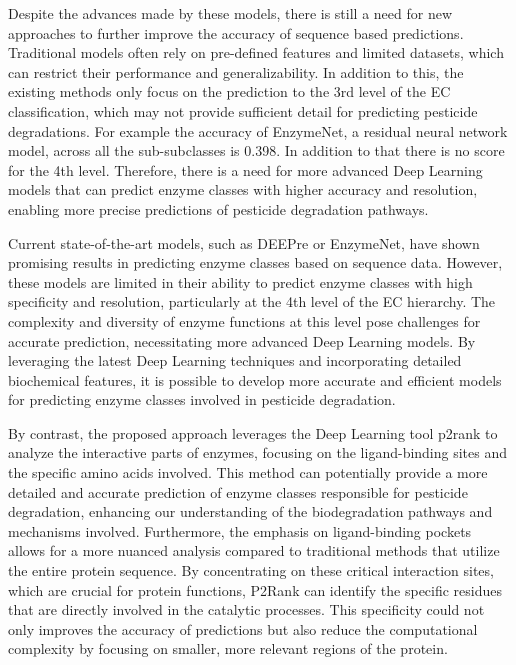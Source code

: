 Despite the advances made by these models, there is still a need for new approaches to further improve the accuracy of sequence based predictions. Traditional models often rely on pre-defined features and limited datasets, which can restrict their performance and generalizability. In addition to this, the existing methods only focus on the prediction to the 3rd level of the EC classification, which may not provide sufficient detail for predicting pesticide degradations. For example the accuracy of EnzymeNet, a residual neural network model, across all the sub-subclasses is 0.398. In addition to that there is no score for the 4th level. Therefore, there is a need for more advanced Deep Learning models that can predict enzyme classes with higher accuracy and resolution, enabling more precise predictions of pesticide degradation pathways. \autocite{watanabeEnzymeNetResidualNeural2023}

Current state-of-the-art models, such as DEEPre or EnzymeNet, have shown promising results in predicting enzyme classes based on sequence data. However, these models are limited in their ability to predict enzyme classes with high specificity and resolution, particularly at the 4th level of the EC hierarchy. The complexity and diversity of enzyme functions at this level pose challenges for accurate prediction, necessitating more advanced Deep Learning models. By leveraging the latest Deep Learning techniques and incorporating detailed biochemical features, it is possible to develop more accurate and efficient models for predicting enzyme classes involved in pesticide degradation.

By contrast, the proposed approach leverages the Deep Learning tool p2rank to analyze the interactive parts of enzymes, focusing on the ligand-binding sites and the specific amino acids involved. This method can potentially provide a more detailed and accurate prediction of enzyme classes responsible for pesticide degradation, enhancing our understanding of the biodegradation pathways and mechanisms involved. Furthermore, the emphasis on ligand-binding pockets allows for a more nuanced analysis compared to traditional methods that utilize the entire protein sequence. By concentrating on these critical interaction sites, which are crucial for protein functions, P2Rank can identify the specific residues that are directly involved in the catalytic processes. This specificity could not only improves the accuracy of predictions but also reduce the computational complexity by focusing on smaller, more relevant regions of the protein. \autocite{krivakP2RankMachineLearning2018}

